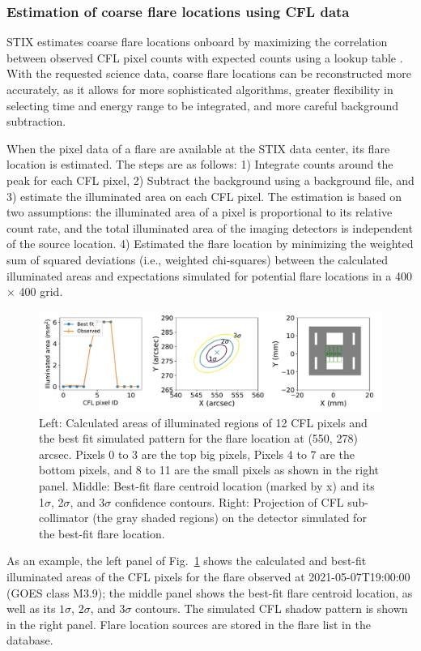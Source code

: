 \documentclass[referee]{preaa} %
\begin{document}
\subsubsection{Estimation of coarse flare locations using CFL data}
STIX estimates coarse flare locations onboard by 
maximizing the correlation between observed CFL pixel counts with expected counts using a lookup table \cite{stix2020}. 
With the requested science data, coarse flare locations can be reconstructed more accurately, as it allows for more sophisticated algorithms, greater flexibility in selecting time and energy range to be integrated, and more careful background subtraction.

When the pixel data of a flare are available at the STIX data center, its flare location is estimated. The steps are as follows: 
1) Integrate counts around the peak for each CFL pixel, 
2) Subtract the background using a background file, and 3) estimate the illuminated area on each CFL pixel.  The estimation is based on two assumptions:  the illuminated area of a pixel is proportional to its relative count rate, and the total illuminated area of the imaging detectors is independent of the source location.
4) Estimated the flare location by minimizing the weighted sum of squared deviations (i.e., weighted chi-squares) between the calculated illuminated areas and expectations simulated for potential flare locations in a 400 $\times$ 400 grid.
\begin{figure}
  \centering
  \includegraphics[width=0.95\linewidth]{figures/cflMay07.pdf}
  \caption{
   Left: Calculated areas of illuminated regions of 12 CFL pixels and the best fit simulated pattern for the flare location at (550, 278) arcsec. Pixels 0 to 3 are the top big pixels, Pixels 4 to 7 are the bottom pixels, and 8 to 11 are the small pixels as shown in the right panel.
   Middle: Best-fit flare centroid location (marked by x) and its 1$\sigma$, 2$\sigma$, and 3$\sigma$ confidence contours. Right: Projection of CFL sub-collimator (the gray shaded regions) on the detector simulated for the best-fit flare location. }
  \label{fig:cfl}
\end{figure}
As an example, the left panel of Fig.~\ref{fig:cfl} shows the calculated and best-fit illuminated areas of the CFL pixels for the flare observed at 2021-05-07T19:00:00 (GOES class M3.9);  the middle panel shows the best-fit flare centroid location, as well as its $1\sigma$, $2\sigma$, and $3\sigma$ contours. 
The simulated CFL shadow pattern is shown in the right panel. 
Flare location sources are stored in the flare list in the database. 
\end{document}
